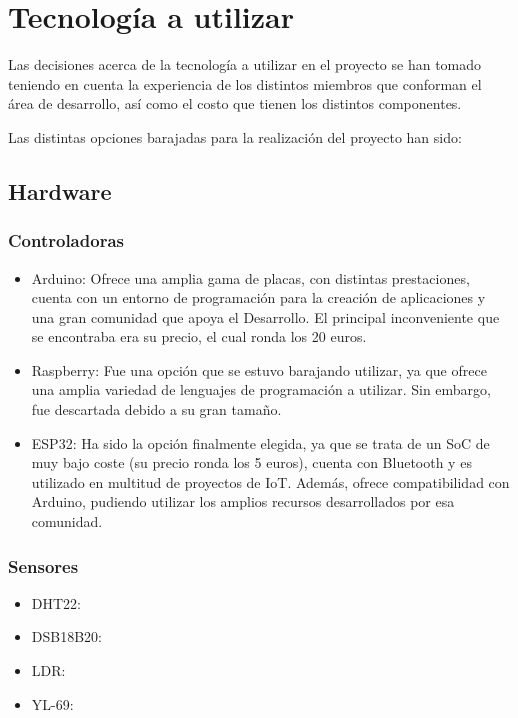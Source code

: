 \documentclass[runningheads]{llncs}
\begin{document}
\section{Tecnología a utilizar}
Las decisiones acerca de la tecnología a utilizar en el proyecto se han tomado 
teniendo en cuenta la experiencia de los distintos miembros que conforman el 
área de desarrollo, así como el costo que tienen los distintos componentes.

\newline
Las distintas opciones barajadas para la realización del proyecto han sido:

\subsection*{Hardware}
\subsubsection*{Controladoras}
\begin{itemize}
    \item Arduino: Ofrece una amplia gama de placas, con distintas prestaciones,
    cuenta con un entorno de programación para la creación de aplicaciones y 
    una gran comunidad que apoya el Desarrollo. El principal inconveniente que 
    se encontraba era su precio, el cual ronda los 20 euros.
    
    \item Raspberry: Fue una opción que se estuvo barajando utilizar, ya que 
    ofrece una amplia variedad de lenguajes de programación a utilizar. 
    Sin embargo, fue descartada debido a su gran tamaño.
    
    \item ESP32: Ha sido la opción finalmente elegida, ya que se trata de un SoC
    de muy bajo coste (su precio ronda los 5 euros), cuenta con Bluetooth y es 
    utilizado en multitud de proyectos de IoT. Además, ofrece compatibilidad con
    Arduino, pudiendo utilizar los amplios recursos desarrollados por esa 
    comunidad.
\end{itemize}

\subsubsection*{Sensores}
\begin{itemize}
    \item DHT22:
    \item DSB18B20:
    \item LDR:
    \item YL-69:
\end{itemize}
\end{document}
